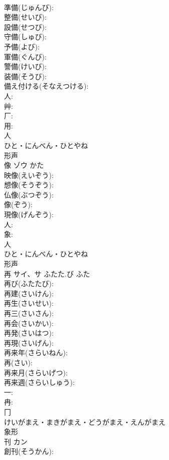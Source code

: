 \documentclass[8pt]{extreport}
\begin{document}
\begin{CJK}{UTF8}{min}
\\	準備(じゅんび): 
\\	整備(せいび): 
\\	設備(せつび): 
\\	守備(しゅび): 
\\	予備(よび): 
\\	軍備(ぐんび): 
\\	警備(けいび): 
\\	装備(そうび): 
\\	備え付ける(そなえつける): 
\\	人: 
\\	艸: 
\\	厂: 
\\	用: 
\\	人	
\\	ひと・にんべん・ひとやね	
\\	形声 
\\	像	ゾウ		かた	
\\	映像(えいぞう): 
\\	想像(そうぞう): 
\\	仏像(ぶつぞう): 
\\	像(ぞう): 
\\	現像(げんぞう): 
\\	人: 
\\	象: 
\\	人	
\\	ひと・にんべん・ひとやね	
\\	形声 
\\	再	サイ、サ	ふたた.び	ふた	
\\	再び(ふたたび): 
\\	再建(さいけん): 
\\	再生(さいせい): 
\\	再三(さいさん): 
\\	再会(さいかい): 
\\	再発(さいはつ): 
\\	再現(さいげん): 
\\	再来年(さらいねん): 
\\	再(さい): 
\\	再来月(さらいげつ): 
\\	再来週(さらいしゅう): 
\\	一: 
\\	冉: 
\\	冂	
\\	けいがまえ・まきがまえ・どうがまえ・えんがまえ	
\\	象形 
\\	刊	カン			
\\	創刊(そうかん): 

\end{CJK}
\end{document}
